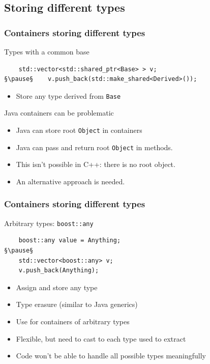 \documentclass[handout]{beamer}
\begin{document}
\subsection{Storing different types}
\begin{frame}[fragile]
  \frametitle{Containers storing different types}
\begin{block}{Types with a common base}
  \begin{lstlisting}
    std::vector<std::shared_ptr<Base> > v;
§\pause§    v.push_back(std::make_shared<Derived>());
\end{lstlisting}
  \begin{itemize}
    \pause
  \item Store any type derived from \texttt{Base}
  \end{itemize}
\end{block}
\pause
\begin{block}{Java containers can be problematic}
  \begin{itemize}
  \item Java can store root \texttt{Object} in containers
  \item Java can pass and return root \texttt{Object} in methods.
    \pause
  \item This isn't possible in C++: there is no root object.
  \item An alternative approach is needed.
  \end{itemize}
\end{block}
\end{frame}

\begin{frame}[fragile]
  \frametitle{Containers storing different types}
\begin{block}{Arbitrary types: \texttt{boost::any}}
  \begin{lstlisting}
    boost::any value = Anything;
§\pause§
    std::vector<boost::any> v;
    v.push_back(Anything);
\end{lstlisting}
  \begin{itemize}
    \pause
  \item Assign and store any type
  \item Type erasure (similar to Java generics)
  \item Use for containers of arbitrary types
    \pause
  \item Flexible, but need to cast to each type used to extract
  \item Code won't be able to handle all possible types meaningfully
  \end{itemize}
\end{block}
\end{frame}
\end{document}
